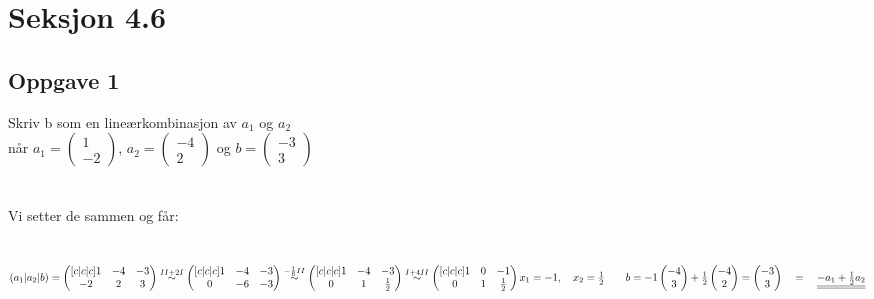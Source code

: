\documentclass{article}
\newcommand{\vect}[1]{\begin{pmatrix} #1 \end{pmatrix}}
\newcommand{\uu}[1]{\underline{\underline{#1}}}
\newcommand{\eqq}{\quad=\quad}
\newcommand{\eqqto}[1]{\overset{\substack{#1}}{\sim}}
\begin{document}
\newpage
\section*{Seksjon 4.6}
\subsection*{Oppgave 1}
Skriv b som en lineærkombinasjon av $a_1$ og $a_2$ \\
når $a_1 = \vect{1\\-2}$,  $a_2 = \vect{-4\\2}$ og $b = \vect{-3\\3}$
\\\\\\
Vi setter de sammen og får:
\\\\\\
\((a_1|a_2|b) =
\begin{pmatrix}[c|c|c]
1&-4&-3\\
-2&2&3
\end{pmatrix}
\eqqto{II+2I}
\begin{pmatrix}[c|c|c]
1&-4&-3\\
0&-6&-3
\end{pmatrix}
\eqqto{-\frac{1}{6}II}
\begin{pmatrix}[c|c|c]
1&-4&-3\\
0&1&\frac{1}{2}
\end{pmatrix}
\eqqto{I+4II}
\begin{pmatrix}[c|c|c]
1&0&-1\\
0&1&\frac{1}{2}
\end{pmatrix}
\\\\\\\\
x_1 = -1, \quad x_2 = \frac{1}{2} \qquad b = -1\vect{-4\\3} + \frac{1}{2}\vect{-4\\2} = \vect{-3\\3} \eqq \uu{-a_1 + \frac{1}{2}a_2}
\)
\\\\\\\\
\end{document}
